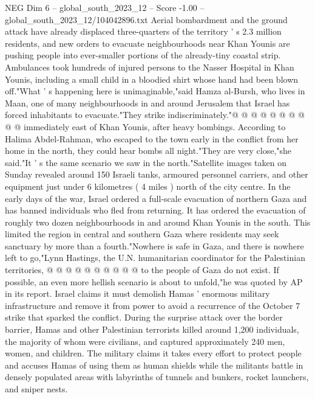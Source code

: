 \begin{textsample}{NEG Dim 6 – global\_south\_2023\_12 – Score -1.00 – global\_south\_2023\_12/104042896.txt}
Aerial bombardment and the ground attack have already displaced three-quarters of the territory ' s 2.3 million residents, and new orders to evacuate neighbourhoods near Khan Younis are pushing people into ever-smaller portions of the already-tiny coastal strip.
Ambulances took hundreds of injured persons to the Nasser Hospital in Khan Younis, including a small child in a bloodied shirt whose hand had been blown off."What ' s happening here is unimaginable,"said Hamza al-Bursh, who lives in Maan, one of many neighbourhoods in and around Jerusalem that Israel has forced inhabitants to evacuate."They strike indiscriminately."@ @ @ @ @ @ @ @ @ @ immediately east of Khan Younis, after heavy bombings.
According to Halima Abdel-Rahman, who escaped to the town early in the conflict from her home in the north, they could hear bombs all night."They are very close,"she said."It ' s the same scenario we saw in the north."Satellite images taken on Sunday revealed around 150 Israeli tanks, armoured personnel carriers, and other equipment just under 6 kilometres ( 4 miles ) north of the city centre.
In the early days of the war, Israel ordered a full-scale evacuation of northern Gaza and has banned individuals who fled from returning.
It has ordered the evacuation of roughly two dozen neighbourhoods in and around Khan Younis in the south.
This limited the region in central and southern Gaza where residents may seek sanctuary by more than a fourth."Nowhere is safe in Gaza, and there is nowhere left to go,"Lynn Hastings, the U.N. humanitarian coordinator for the Palestinian territories, @ @ @ @ @ @ @ @ @ @ to the people of Gaza do not exist.
If possible, an even more hellish scenario is about to unfold,"he was quoted by AP in its report.
Israel claims it must demolish Hamas ' enormous military infrastructure and remove it from power to avoid a recurrence of the October 7 strike that sparked the conflict.
During the surprise attack over the border barrier, Hamas and other Palestinian terrorists killed around 1,200 individuals, the majority of whom were civilians, and captured approximately 240 men, women, and children.
The military claims it takes every effort to protect people and accuses Hamas of using them as human shields while the militants battle in densely populated areas with labyrinths of tunnels and bunkers, rocket launchers, and sniper nests.

\end{textsample}
